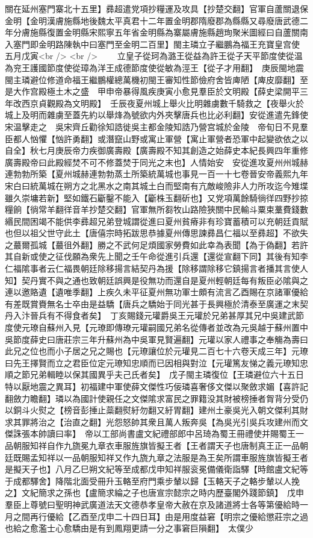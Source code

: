 關在延州塞門寨北十五里】彞超遣党項抄糧運及攻具【抄楚交翻】官軍自蘆關退保金明【金明漢膚施縣地後魏太平真君十二年置金明郡隋廢郡為縣縣又尋廢唐武德二年分膚施縣復置金明縣宋熙寧五年省金明縣為寨屬膚施縣趙珣聚米圖經曰自蘆關南入塞門即金明路陳執中曰塞門至金明二百里】閩主璘立子繼鵬為福王充寶皇宫使　五月戊寅<br />
<br />
　　立皇子從珂為潞王從益為許王從子天平節度使從温為兖王護國節度使從璋為洋王成德節度使從敏為涇王【從子才用翻】　庚辰閩地震閩主璘避位修道命福王繼鵬權總萬機初閩王審知性節儉府舍皆庳陋【庳皮靡翻】至是大作宫殿極土木之盛　甲申帝暴得風疾庚寅小愈見羣臣於文明殿【薛史梁開平三年改西京貞觀殿為文明殿】　壬辰夜夏州城上舉火比明雜虜數千騎救之【夜舉火於城上及明而雜虜至蓋先約以舉烽為號欲内外夾擊唐兵也比必利翻】安從進遣先鋒使宋温擊走之　吳宋齊丘勸徐知誥徙吳主都金陵知誥乃營宫城於金陵　帝旬日不見羣臣都人忷懼【忷許勇翻】或潛竄山野或寓止軍營【寓止軍營者恐軍中起變欲依之以自全】秋七月庚辰帝力疾御廣壽殿【廣壽殿不知其創造之始薛史本紀長興四年重修廣壽殿帝曰此殿經焚不可不修蓋焚于同光之末也】人情始安　安從進攻夏州州城赫連勃勃所築【夏州城赫連勃勃蒸土所築統萬城也事見一百一十七卷晉安帝義熙九年宋白曰統萬城在朔方之北黑水之南其城土白而堅南有亢敵峻險非人力所攻迄今雉堞雖久崇墉若新】堅如鐵石斸鑿不能入【斸株玉翻斫也】又党項萬餘騎徜徉四野抄掠糧餉【徜常羊翻徉音羊抄楚交翻】官軍無所芻牧山路險狹關中民輸斗粟束藳費錢數緡民間困竭不能供李彞超兄弟登城謂從進曰夏州貧瘠非有珍寶蓄積可以充朝廷貢賦也但以祖父世守此土【唐僖宗時拓跋思恭據夏州傳思諫彞昌仁福以至彞超】不欲失之蕞爾孤城【蕞徂外翻】勝之不武何足煩國家勞費如此幸為表聞【為于偽翻】若許其自新或使之征伐願為衆先上聞之壬午命從進引兵還【還從宣翻下同】其後有知李仁福隂事者云仁福畏朝廷除移揚言結契丹為援【除移謂除移它鎮揚言者播其言使人知】契丹實不與之通也致朝廷誤興是役無功而還自是夏州輕朝廷每有叛臣必隂與之連以邀賂遺【遺唯季翻】上疾久未平征夏州無功軍士頗有流言乙酉賜在京諸軍優給有差既賞賚無名士卒由是益驕【唐兵之驕始于同光甚于長興極於清泰至廣運之末契丹入汴晉兵有不得食者矣】　丁亥賜錢元瓘爵吳王元瓘於兄弟甚厚其兄中吳建武節度使元璙自蘇州入見【元璙即傳璙元瓘嗣國兄弟名從傳者並改為元吳越于蘇州置中吳節度薛史曰唐莊宗三年升蘇州為中吳軍見賢遍翻】元瓘以家人禮事之奉觴為壽曰此兄之位也而小子居之兄之賜也【元璙讓位於元瓘見二百七十六卷天成三年】元璙曰先王擇賢而立之君臣位定元璙知忠順而已因相與對泣【元瓘篤友悌之義元璙知忠順之節兄弟輯睦以保其國異乎夫己氏者矣】　戊子閩主璘復位【王璘避位六十五日特以厭地震之異耳】初福建中軍使薛文傑性巧佞璘喜奢侈文傑以聚斂求媚【喜許記翻斂力瞻翻】璘以為國計使親任之文傑隂求富民之罪籍没其財被榜捶者胷背分受仍以銅斗火熨之【榜音彭捶止蘂翻熨紆勿翻又紆胃翻】建州土豪吳光入朝文傑利其財求其罪將治之【治直之翻】光怨怒帥其衆且萬人叛奔吳【為吳光引吳兵攻建州而文傑誅張本帥讀曰率】　帝以工部尚書盧文紀禮部郎中呂琦為蜀王冊禮使并賜蜀王一品朝服知祥自作九旒冕九章衣車服旌旗皆擬王者【王者謂天子也唐制真王正一品朝廷既賜孟知祥以一品朝服知祥又作九旒九章之法服是為王矣所謂車服旌旗皆擬王者是擬天子也】八月乙巳朔文紀等至成都戊申知祥服衮冕備儀衛詣驛【時館盧文紀等于成都驛舍】降階北面受冊升玉輅至府門乘步輦以歸【玉輅天子之輅步輦以人挽之】文紀簡求之孫也【盧簡求綸之子也唐宣宗懿宗之時内歷臺閣外踐節鎮】　戊申羣臣上尊號曰聖明神武廣道法天文德恭孝皇帝大赦在京及諸道將士各等第優給時一月之間再行優給【乙酉至戊申二十四日耳】由是用度益窘【明宗之優給懲莊宗之過也給之愈濫士心愈驕由是有到鳳翔更請一分之事窘巨隕翻】　太僕少